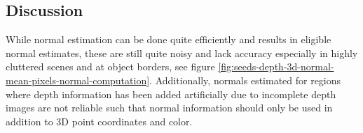 \subsection{Discussion}

While normal estimation can be done quite efficiently and results in eligible normal estimates, these are still quite noisy and lack accuracy especially in highly cluttered scenes and at object borders, see figure \ref{fig:seeds-depth-3d-normal-mean-pixels-normal-computation}. Additionally, normals estimated for regions where depth information has been added artificially due to incomplete depth images are not reliable such that normal information should only be used in addition to 3D point coordinates and color.

